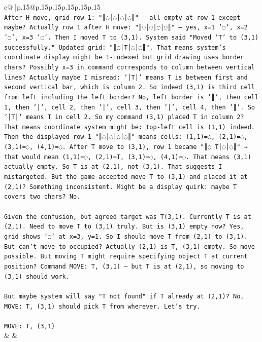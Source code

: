 \documentclass{article}
\begin{document}
{\begin{supertabular}{c@{$\;$}|p{.15\linewidth}@{}p{.15\linewidth}p{.15\linewidth}p{.15\linewidth}p{.15\linewidth}p{.15\linewidth}}
{{{\\ 
\texttt{After H move, grid row 1: "║◌│◌│◌│◌║" — all empty at row 1 except maybe? Actually row 1 after H move: "║◌│◌│◌│◌║" — yes, x=1 '◌', x=2 '◌', x=3 '◌'. Then I moved T to (3,1). System said "Moved 'T' to (3,1) successfully." Updated grid: "║◌│T│◌│◌║". That means system's coordinate display might be 1{-}indexed but grid drawing uses border chars? Possibly x=3 in command corresponds to column between vertical lines? Actually maybe I misread: '│T│' means T is between first and second vertical bar, which is column 2. So indeed (3,1) is third cell from left including the left border? No, left border is '║', then cell 1, then '│', cell 2, then '│', cell 3, then '│', cell 4, then '║'. So '│T│' means T in cell 2. So my command (3,1) placed T in column 2? That means coordinate system might be: top{-}left cell is (1,1) indeed. Then the displayed row 1 "║◌│◌│◌│◌║" means cells: (1,1)=◌, (2,1)=◌, (3,1)=◌, (4,1)=◌. After T move to (3,1), row 1 became "║◌│T│◌│◌║" → that would mean (1,1)=◌, (2,1)=T, (3,1)=◌, (4,1)=◌. That means (3,1) actually empty. So T is at (2,1), not (3,1). That suggests I mistargeted. But the game accepted move T to (3,1) and placed it at (2,1)? Something inconsistent. Might be a display quirk: maybe T covers two chars? No.} \\
\\ 
\texttt{Given the confusion, but agreed target was T(3,1). Currently T is at (2,1). Need to move T to (3,1) truly. But is (3,1) empty now? Yes, grid shows '◌' at x=3, y=1. So I should move T from (2,1) to (3,1). But can't move to occupied? Actually (2,1) is T, (3,1) empty. So move possible. But moving T might require specifying object T at current position? Command MOVE: T, (3,1) — but T is at (2,1), so moving to (3,1) should work.} \\
\\ 
\texttt{But maybe system will say "T not found" if T already at (2,1)? No, MOVE: T, (3,1) should pick T from wherever. Let's try.} \\
\\ 
\texttt{MOVE: T, (3,1)} \\
            }
        }
    }
    & & \\ \\


\end{supertabular}}
\end{document}
